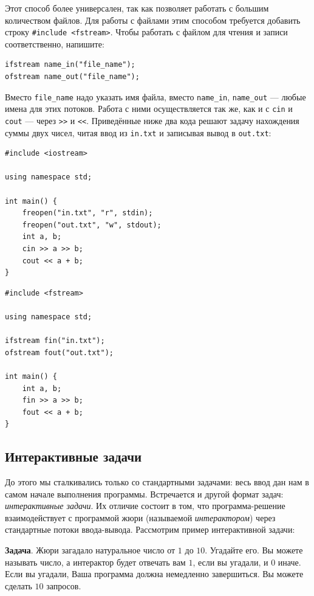 \documentclass{article}
\newcommand{\task}[1]{\textbf{Задача}. #1}
\begin{document}
	Этот способ более универсален, так как позволяет работать с большим количеством файлов. Для работы с файлами этим способом требуется добавить строку \texttt{\#include <fstream>}. Чтобы работать с файлом для чтения и записи соответственно, напишите:
	
	\begin{lstlisting}
ifstream name_in("file_name");
ofstream name_out("file_name");
	\end{lstlisting}
	
	Вместо \texttt{file\_name} надо указать имя файла, вместо \texttt{name\_in}, \texttt{name\_out} --- любые имена для этих потоков. Работа с ними осуществляется так же, как и с \texttt{cin} и \texttt{cout} --- через \texttt{>{}>} и \texttt{<{}<}. Приведённые ниже два кода решают задачу нахождения суммы двух чисел, читая ввод из \texttt{in.txt} и записывая вывод в \texttt{out.txt}:

	\begin{lstlisting}
#include <iostream>

using namespace std;

int main() {
	freopen("in.txt", "r", stdin);
	freopen("out.txt", "w", stdout);
	int a, b;
	cin >> a >> b;
	cout << a + b;
}
	\end{lstlisting}

	\begin{lstlisting}
#include <fstream>

using namespace std;

ifstream fin("in.txt");
ofstream fout("out.txt");

int main() {
	int a, b;
	fin >> a >> b;
	fout << a + b;
}
	\end{lstlisting}
	
	\subsection{Интерактивные задачи}
	\label{sec:interactive}

	До этого мы сталкивались только со стандартными задачами: весь ввод дан нам в самом начале выполнения программы. Встречается и другой формат задач: \textit{интерактивные задачи}. Их отличие состоит в том, что программа-решение взаимодействует с программой жюри (называемой \textit{интерактором}) через стандартные потоки ввода-вывода. Рассмотрим пример интерактивной задачи:

	\task{Жюри загадало натуральное число от $1$ до $10$. Угадайте его. Вы можете называть число, а интерактор будет отвечать вам $1$, если вы угадали, и $0$ иначе. Если вы угадали, Ваша программа должна немедленно завершиться. Вы можете сделать $10$ запросов.}
\end{document}
